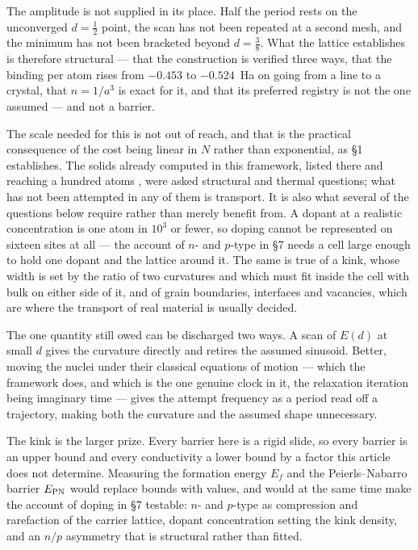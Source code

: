 \documentclass[11pt]{article}
\newcommand{\half}{\tfrac12}
\begin{document}
The amplitude is not supplied in its place. Half the period rests on the unconverged $d=\half$
point, the scan has not been repeated at a second mesh, and the minimum has not been bracketed
beyond $d=\tfrac38$. What the lattice establishes is therefore structural --- that the construction
is verified three ways, that the binding per atom rises from $-0.453$ to $-0.524$~Ha on going from a
line to a crystal, that $n=1/a^3$ is exact for it, and that its preferred registry is not the one
assumed --- and not a barrier.

The scale needed for this is not out of reach, and that is the practical consequence of the cost
being linear in $N$ rather than exponential, as \S1 establishes. The solids already computed in this
framework, listed there and reaching a hundred atoms \cite{code}, were asked structural and thermal
questions; what has not been attempted in any of them is transport. It is also what several of
the questions below require rather than merely benefit from. A dopant at a realistic concentration
is one atom in $10^3$ or fewer, so doping cannot be represented on sixteen sites at all --- the
account of $n$- and $p$-type in \S7 needs a cell large enough to hold one dopant and the lattice
around it. The same is true of a kink, whose width is set by the ratio of two curvatures and which
must fit inside the cell with bulk on either side of it, and of grain boundaries, interfaces and
vacancies, which are where the transport of real material is usually decided.

The one quantity still owed can be discharged two ways. A scan of $E(d)$ at small $d$ gives the
curvature directly and retires the assumed sinusoid. Better, moving the nuclei under their classical
equations of motion --- which the framework does, and which is the one genuine clock in it, the
relaxation iteration being imaginary time --- gives the attempt frequency as a period read off a
trajectory, making both the curvature and the assumed shape unnecessary.

The kink is the larger prize. Every barrier here is a rigid slide, so every barrier is an upper
bound and every conductivity a lower bound by a factor this article does not determine. Measuring
the formation energy $E_f$ and the Peierls--Nabarro barrier $E_{\rm PN}$ would replace bounds with
values, and would at the same time make the account of doping in \S7 testable: $n$- and $p$-type as
compression and rarefaction of the carrier lattice, dopant concentration setting the kink density,
and an $n/p$ asymmetry that is structural rather than fitted.
\end{document}
